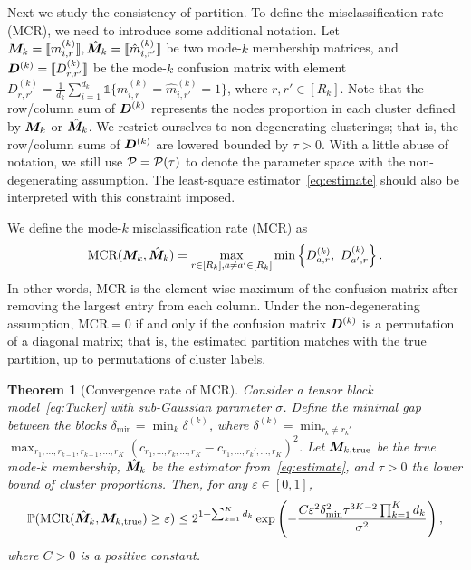 \documentclass{article}
\newtheorem{theorem}{Theorem}
\begin{document}
Next we study the consistency of partition. To define the misclassification rate (MCR), we need to introduce some additional notation. Let $\bm M_k=\llbracket m^{(k)}_{i,r} \rrbracket, \hat{\bm M}_k=\llbracket \hat m^{(k)}_{i,r'} \rrbracket$ be two mode-$k$ membership matrices, and $\bm{D}^{(k)}=\llbracket D_{r,r'}^{(k)} \rrbracket$ be the mode-$k$ confusion matrix with element $D_{r,r'}^{(k)}=\frac{1}{d_k}\sum_{i=1}^{d_k}\mathds{1}\{m_{i,r}^{(k)}=\hat{m}_{i,r'}^{(k)}=1\}$, where $r,r'\in[R_k]$. Note that the row/column sum of $\bm{D}^{(k)}$ represents the nodes proportion in each cluster defined by $\bm M_k$ or $\hat{\bm M}_k$. We restrict ourselves to non-degenerating clusterings; that is, the row/column sums of $\bm{D}^{(k)}$ are lowered bounded by $\tau>0$. With a little abuse of notation, we still use $\mathcal{P}=\mathcal{P}(\tau)$ to denote the parameter space with the non-degenerating assumption. The least-square estimator~\eqref{eq:estimate} should also be interpreted with this constraint imposed. 

We define the mode-$k$ misclassification rate (MCR) as
\begin{equation} \label{eq:MCR}
\text{MCR}(\bm M_k,\hat{\bm M}_k) = \max_{r\in [R_k], a\neq a'\in [R_k]}\min\left\{ D^{(k)}_{a,r},\ D^{(k)}_{a',r}\right\}.
\end{equation}
In other words, MCR is the element-wise maximum of the confusion matrix after removing the largest entry from each column. Under the non-degenerating assumption, $\text{MCR}=0$ if and only if the confusion matrix $\bm{D}^{(k)}$ is a permutation of a diagonal matrix; that is, the estimated partition matches with the true partition, up to permutations of cluster labels. 



\begin{theorem}[Convergence rate of MCR] \label{thm:mcr}
Consider a tensor block model~\eqref{eq:Tucker} with sub-Gaussian parameter $\sigma$. Define the minimal gap between the blocks $\delta_{\min}=\min_k\delta^{(k)}$, where $\delta^{(k)}=\min_{r_k\neq r_k'}$ $\max_{r_1,\ldots,r_{k-1},r_{k+1},\ldots,r_K}(c_{r_1,\ldots,r_k,\ldots,r_K}-c_{r_1,\ldots,r_k',\ldots,r_K})^2$. Let $\bm M_{k,\text{true}}$ be the true mode-$k$ membership, $\hat {\bm M}_k$ be the estimator from~\eqref{eq:estimate}, and $\tau>0$ the lower bound of cluster proportions. Then, for any $\varepsilon\in[0,1]$,
		\begin{equation} \label{eq:mcrbound}
	\mathbb{P}(\text{MCR}(\hat{\bm M}_k, \bm M_{k,\text{true}})\geq \varepsilon) \leq  2^{1+\sum_{k=1}^Kd_k}\exp \left(-\frac{C\varepsilon^2\delta_{\min}^2\tau^{3K-2}\prod_{k=1}^Kd_k}{\sigma^2}\right),
	\end{equation}
where $C>0$ is a positive constant.
\end{theorem}
\end{document}
